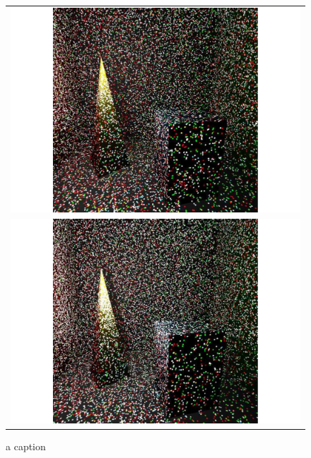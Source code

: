 \begin{figure}
\begin{center}
{\begin{tabular}{c}
\includegraphics*[scale=0.25]{imgs/pqv_frame2.pdf}\\
\includegraphics*[scale=0.25]{imgs/pqv_frame3.pdf}
\end{tabular}
}%
\caption{a caption}
\end{center}

\end{figure}

